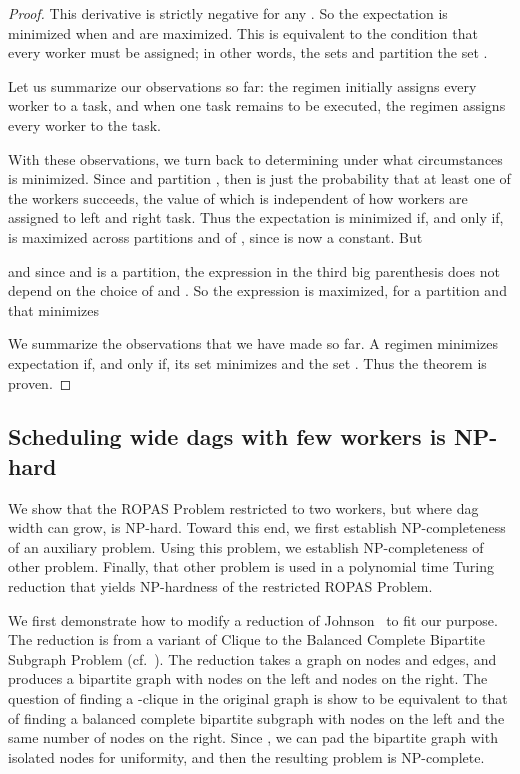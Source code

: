 \documentclass[letterpaper,11pt]{article}
\begin{document}
\begin{proof}
This derivative is strictly negative for any . So the expectation is minimized when  and  are maximized. This is equivalent to the condition that every worker must be assigned; in other words, the sets  and  partition the set . 

Let us summarize our observations so far: the regimen initially assigns every worker to a task, and when one task remains to be executed, the regimen assigns every worker to the task.

With these observations, we turn back to determining under what circumstances  is minimized. Since  and  partition , then  is just the probability that at least one of the  workers succeeds, the value of which is independent of how workers are assigned to left and right task. Thus the expectation is minimized if, and only if,  is maximized across partitions  and  of , since  is now a constant. But

and since  and  is a partition, the expression in the third big parenthesis does not depend on the choice of  and . So the expression is maximized, for a partition  and  that minimizes


We summarize the observations that we have made so far. A regimen minimizes expectation if, and only if, its set  minimizes  and the set . Thus the theorem is proven.
\end{proof}




\subsection{Scheduling wide dags with few workers is NP-hard}
\label{s.wide_few}

We show that the ROPAS Problem restricted to two workers, but where dag width can grow, is NP-hard. Toward this end, we first establish NP-completeness of an auxiliary problem. Using this problem, we establish NP-completeness of other problem. Finally, that other problem is used in a polynomial time Turing reduction that yields NP-hardness of the restricted ROPAS Problem.


We first demonstrate how to modify a reduction of Johnson~\cite{Joh87} to fit our purpose. The reduction is from a variant of Clique to the Balanced Complete Bipartite Subgraph Problem (cf.~\cite{Pee03}). The reduction takes a graph on  nodes and  edges, and produces a bipartite graph with  nodes on the left and  nodes on the right. The question of finding a -clique in the original graph is show to be equivalent to that of finding a balanced complete bipartite subgraph with  nodes on the left and the same number of nodes on the right. Since , we can pad the bipartite graph with isolated nodes for uniformity, and then the resulting problem is NP-complete.
\end{document}
